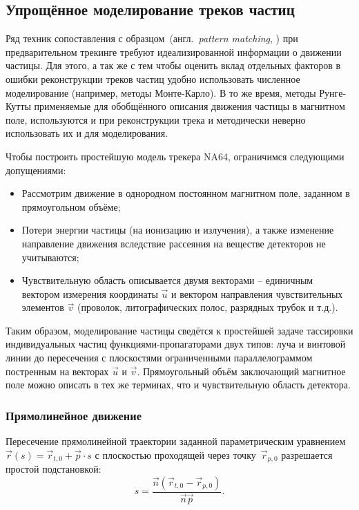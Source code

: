 \subsection{Упрощённое моделирование треков частиц}

Ряд техник сопоставления с
образцом~(англ.~\emph{pattern matching}, \cite{MankelTracking}) при
предварительном трекинге требуют
идеализированной информации о движении частицы. Для этого, а так же с тем чтобы
оценить вклад отдельных факторов в ошибки реконструкции треков
частиц удобно использовать численное моделирование (например, методы
Монте-Карло). В то же время, методы Рунге-Кутты применяемые для обобщённого
описания движения частицы в магнитном поле, используются и при реконструкции
трека и методически неверно использовать их и для моделирования.

Чтобы построить простейшую модель трекера NA64, ограничимся следующими
допущениями:
\begin{itemize}
    \item Рассмотрим движение в однородном постоянном магнитном поле, заданном
    в прямоугольном объёме;
    \item Потери энергии частицы (на ионизацию и излучения), а
    также изменение направление движения вследствие рассеяния на веществе
    детекторов не учитываются;
    \item Чувствительную область описывается двумя векторами --
    единичным вектором измерения координаты $\vec{u}$ и вектором направления
    чувствительных элементов $\vec{v}$ (проволок, литографических полос,
    разрядных трубок и т.д.).
\end{itemize}
Таким образом, моделирование частицы сведётся к простейшей задаче тассировки
индивидуальных частиц функциями-пропагаторами двух типов: луча и винтовой
линии до пересечения с плоскостями ограниченными параллелограммом постренным
на векторах $\vec{u}$ и $\vec{v}$. Прямоугольный объём заключающий магнитное
поле можно описать в тех же терминах, что и чувствительную область детектора.

\subsubsection{Прямолинейное движение}

Пересечение прямолинейной траектории заданной параметрическим
уравнением~$\vec{r}(s) = \vec{r}_{t,0} + \vec{p} \cdot s$ с плоскостью
проходящей через точку~$\vec{r}_{p,0}$ разрешается простой подстановкой:
\begin{equation}
    s = \frac{\vec{n}(\vec{r}_{t,0} - \vec{r}_{p,0})}{\vec{n} \vec{p}}.
    \label{eq:trackletPlaneIP}
\end{equation}

